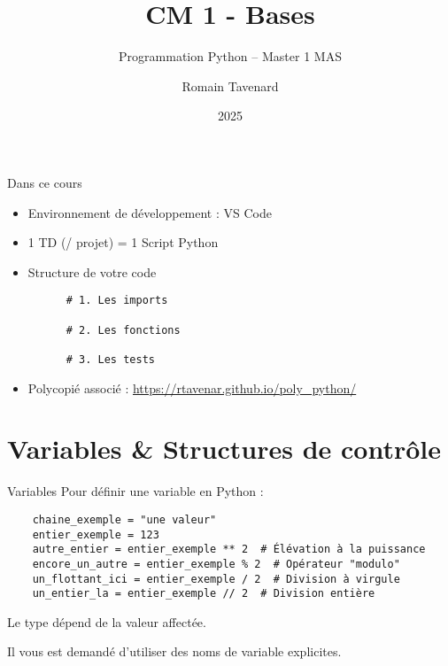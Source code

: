 \documentclass[10pt]{beamer}
\title[M1 MAS -- Python -- Bases]{CM 1 - Bases}
\subtitle{Programmation Python -- Master 1 MAS}
\author{Romain Tavenard}
\date{2025}
\institute{%
\hypersetup{urlcolor=.}
\makebox[2.2ex][c]{\faEnvelope}\enspace\href{mailto:romain.tavenard@univ-rennes2.fr}{\texttt{romain.tavenard@univ-rennes2.fr}}\\%
}
\begin{document}
\maketitle

\begin{frame}[fragile]{Dans ce cours}  
  \begin{itemize}
    \item Environnement de développement : VS Code
    \item 1 TD (/ projet) = 1 Script Python
    \item Structure de votre code
    \begin{beamercodeblock}
      \begin{verbatim}
      # 1. Les imports
  
      # 2. Les fonctions
  
      # 3. Les tests
      \end{verbatim}
    \end{beamercodeblock}
    \item Polycopié associé : \url{https://rtavenar.github.io/poly_python/}
  \end{itemize}

\end{frame}

\section{Variables \& Structures de contrôle}

\begin{frame}[fragile]{Variables}  
  Pour définir une variable en Python :
  \begin{beamercodeblock}
    \begin{verbatim}
    chaine_exemple = "une valeur"
    entier_exemple = 123
    autre_entier = entier_exemple ** 2  # Élévation à la puissance
    encore_un_autre = entier_exemple % 2  # Opérateur "modulo"
    un_flottant_ici = entier_exemple / 2  # Division à virgule
    un_entier_la = entier_exemple // 2  # Division entière
    \end{verbatim}
  \end{beamercodeblock}
  Le type dépend de la valeur affectée.

  Il vous est demandé d'utiliser des \alert{noms de variable explicites}.
\end{frame}
\end{document}
